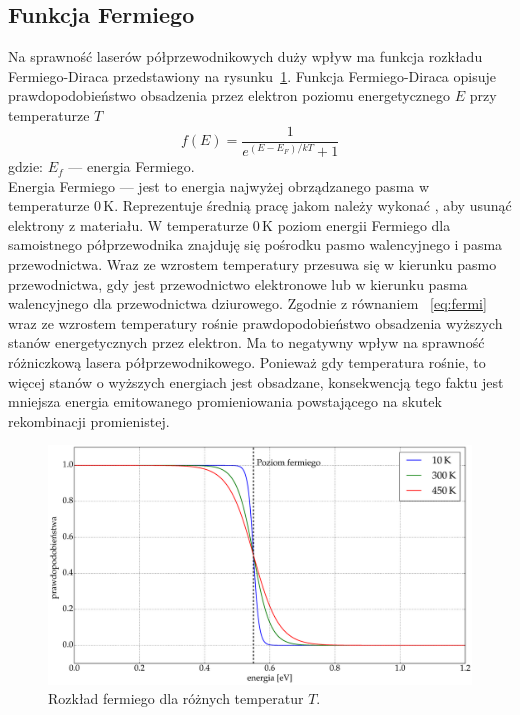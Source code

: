 \subsection{Funkcja Fermiego}
Na sprawność laserów półprzewodnikowych duży wpływ ma funkcja rozkładu Fermiego-Diraca przedstawiony na rysunku~\ref{fig:teoria_rys_3}. Funkcja Fermiego-Diraca opisuje prawdopodobieństwo obsadzenia przez elektron poziomu
energetycznego $E$ przy temperaturze $T$
\begin{equation}
\label{eq:fermi}
f(E) = \frac{1}{e^{(E-E_F)/kT} + 1}
\end{equation}
gdzie: $E_f$ --- energia Fermiego. \\
Energia Fermiego --- jest to energia najwyżej obrządzanego pasma w temperaturze 0\,K. Reprezentuje średnią pracę jakom należy wykonać
, aby usunąć elektrony z materiału. W temperaturze 0\,K poziom energii Fermiego dla samoistnego półprzewodnika znajduję się pośrodku pasmo walencyjnego i
pasma przewodnictwa. Wraz ze wzrostem temperatury przesuwa się w kierunku pasmo przewodnictwa, gdy jest przewodnictwo elektronowe lub
w kierunku pasma walencyjnego dla przewodnictwa dziurowego.
Zgodnie z równaniem ~\ref{eq:fermi} wraz ze wzrostem temperatury rośnie prawdopodobieństwo obsadzenia wyższych stanów energetycznych przez elektron. Ma to
negatywny wpływ na sprawność różniczkową lasera półprzewodnikowego. Ponieważ gdy temperatura rośnie, to więcej stanów o
wyższych energiach jest obsadzane, konsekwencją tego faktu jest mniejsza energia emitowanego promieniowania powstającego na
skutek rekombinacji promienistej.
\begin{figure}[H]
\center
  \includegraphics[scale=0.25]{fermi.eps}
  \caption{Rozkład fermiego dla różnych temperatur $T$.}
  \label{fig:teoria_rys_3}
\end{figure}
